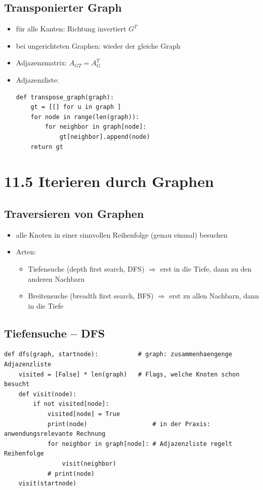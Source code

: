 \documentclass[11pt, fleqn]{scrreprt}
\begin{document}
    \subsection*{Transponierter Graph}
    \begin{itemize}
        \item für alle Kanten: Richtung invertiert \hspace*{1cm} $G^T$
        \item bei ungerichteten Graphen: wieder der gleiche Graph
        \item Adjazenzmatrix: $A_{GT} = A_G^T$
        \item Adjazenzliste:
        \begin{verbatim}
def transpose_graph(graph):
    gt = [[] for u in graph ]
    for node in range(len(graph)):
        for neighbor in graph[node]:
            gt[neighbor].append(node)
    return gt
        \end{verbatim}
    \end{itemize}

    \section*{11.5 Iterieren durch Graphen}
    \subsection*{Traversieren von Graphen}
    \begin{itemize}
        \item alle Knoten in einer sinnvollen Reihenfolge (genau einmal) besuchen
        \item Arten:
        \begin{itemize}
            \item Tiefensuche (depth first search, DFS) $\Rightarrow$ erst in die Tiefe, dann zu den anderen Nachbarn
            \item Breitensuche (breadth first search, BFS) $\Rightarrow$ erst zu allen Nachbarn, dann in die Tiefe
        \end{itemize}
    \end{itemize}

    \subsection*{Tiefensuche – DFS}
    \begin{verbatim}
def dfs(graph, startnode):           # graph: zusammenhaengenge Adjazenzliste
    visited = [False] * len(graph)   # Flags, welche Knoten schon besucht
    def visit(node):
        if not visited[node]:
            visited[node] = True
            print(node)                  # in der Praxis: anwendungsrelevante Rechnung
            for neighbor in graph[node]: # Adjazenzliste regelt Reihenfolge
                visit(neighbor)
            # print(node)
    visit(startnode)
    \end{verbatim}
\end{document}
